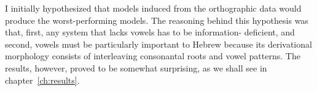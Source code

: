\begin{definition}
I initially hypothesized that models induced from the orthographic 
data would produce the worst-performing models. The reasoning behind this 
hypothesis was that, first, any system that lacks vowels has 
to be information- deficient, and second, vowels must be particularly important to 
Hebrew because its derivational morphology consists of interleaving consonantal 
roots and vowel patterns. The results, however, proved to be somewhat surprising, 
as we shall see in chapter~\ref{ch:results}.



\end{definition}
